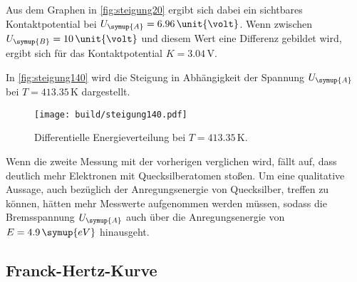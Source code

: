 Aus dem Graphen in \autoref{fig:steigung20} ergibt sich dabei ein sichtbares Kontaktpotential bei $U_{\symup{A}} = 6.96 \,\unit{\volt}$. Wenn zwischen
$U_{\symup{B}} = 10\,\unit{\volt}$ und diesem Wert eine Differenz gebildet wird, ergibt sich für das Kontaktpotential $K = 3.04\,\unit{\volt}$.

In \autoref{fig:steigung140} wird die Steigung in Abhängigkeit der Spannung $U_{\symup{A}}$ bei $T=413.35\,\unit{\kelvin}$ dargestellt.
\begin{figure}
    \centering
    \texttt{[image: build/steigung140.pdf]}
    \caption{Differentielle Energieverteilung bei $T=413.35\,\unit{\kelvin}$.}
    \label{fig:steigung140}
\end{figure}
Wenn die zweite Messung mit der vorherigen verglichen wird, fällt auf, dass deutlich mehr Elektronen mit Quecksilberatomen stoßen. Um eine qualitative
Aussage, auch bezüglich der Anregungsenergie von Quecksilber, treffen zu können, hätten mehr Messwerte aufgenommen werden müssen, sodass die 
Bremsspannung $U_{\symup{A}}$ auch über die Anregungsenergie von $E = 4.9 \, \symup{eV}$ \cite{anregung} hinausgeht.

\subsection{Franck-Hertz-Kurve}